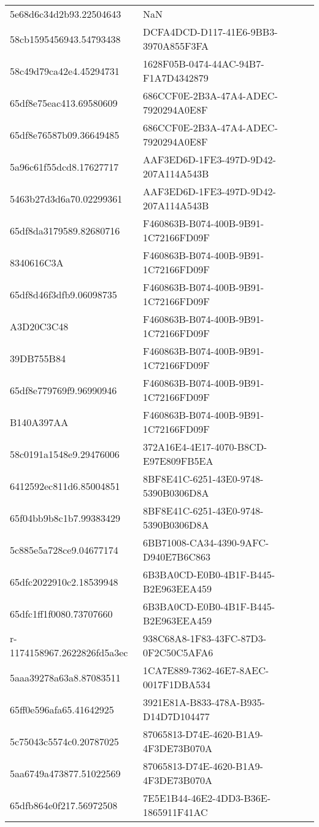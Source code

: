 \begin{tabular}{ll}
5e68d6c34d2b93.22504643 & NaN \\
58cb1595456943.54793438 & DCFA4DCD-D117-41E6-9BB3-3970A855F3FA \\
58c49d79ca42e4.45294731 & 1628F05B-0474-44AC-94B7-F1A7D4342879 \\
65df8e75eac413.69580609 & 686CCF0E-2B3A-47A4-ADEC-7920294A0E8F \\
65df8e76587b09.36649485 & 686CCF0E-2B3A-47A4-ADEC-7920294A0E8F \\
5a96c61f55dcd8.17627717 & AAF3ED6D-1FE3-497D-9D42-207A114A543B \\
5463b27d3d6a70.02299361 & AAF3ED6D-1FE3-497D-9D42-207A114A543B \\
65df8da3179589.82680716 & F460863B-B074-400B-9B91-1C72166FD09F \\
8340616C3A & F460863B-B074-400B-9B91-1C72166FD09F \\
65df8d46f3dfb9.06098735 & F460863B-B074-400B-9B91-1C72166FD09F \\
A3D20C3C48 & F460863B-B074-400B-9B91-1C72166FD09F \\
39DB755B84 & F460863B-B074-400B-9B91-1C72166FD09F \\
65df8e779769f9.96990946 & F460863B-B074-400B-9B91-1C72166FD09F \\
B140A397AA & F460863B-B074-400B-9B91-1C72166FD09F \\
58c0191a1548e9.29476006 & 372A16E4-4E17-4070-B8CD-E97E809FB5EA \\
6412592ec811d6.85004851 & 8BF8E41C-6251-43E0-9748-5390B0306D8A \\
65f04bb9b8c1b7.99383429 & 8BF8E41C-6251-43E0-9748-5390B0306D8A \\
5c885e5a728ce9.04677174 & 6BB71008-CA34-4390-9AFC-D940E7B6C863 \\
65dfc2022910c2.18539948 & 6B3BA0CD-E0B0-4B1F-B445-B2E963EEA459 \\
65dfc1ff1f0080.73707660 & 6B3BA0CD-E0B0-4B1F-B445-B2E963EEA459 \\
r-1174158967.2622826fd5a3ec & 938C68A8-1F83-43FC-87D3-0F2C50C5AFA6 \\
5aaa39278a63a8.87083511 & 1CA7E889-7362-46E7-8AEC-0017F1DBA534 \\
65ff0e596afa65.41642925 & 3921E81A-B833-478A-B935-D14D7D104477 \\
5c75043c5574c0.20787025 & 87065813-D74E-4620-B1A9-4F3DE73B070A \\
5aa6749a473877.51022569 & 87065813-D74E-4620-B1A9-4F3DE73B070A \\
65dfb864e0f217.56972508 & 7E5E1B44-46E2-4DD3-B36E-1865911F41AC \\

\end{tabular}
